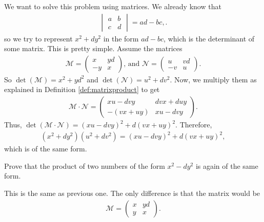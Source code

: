 \documentclass{subfile}
\begin{document}
\begin{solution}
We want to solve this problem using matrices. We already know that 
	\begin{align*}
	\begin{vmatrix}
	a&b\\
	c&d
	\end{vmatrix} = ad-bc,
	.\end{align*}
so we try to represent $x^2+dy^2$ in the form $ad-bc$, which is the determinant of some matrix. This is pretty simple. Assume the matrices
\begin{align*}
\mathcal{M}=\begin{pmatrix}
x & yd\\
-y & x
\end{pmatrix} \text{, and }
\mathcal{N}=\begin{pmatrix}
u & vd\\
-v & u
\end{pmatrix}.
\end{align*}
So $\det(\mathcal M)=x^2+yd^2$ and $\det(\mathcal{N})=u^2+dv^2$.
Now, we multiply them as explained in Definition \eqref{def:matrixproduct} to get
\begin{align*}
\mathcal{M}\cdot\mathcal{N}=\begin{pmatrix}
xu-dvy & dvx+duy\\
-(vx+uy) & xu-dvy
\end{pmatrix}.
\end{align*}
Thus, $\det(\mathcal{M \cdot N})=(xu-dvy)^2+d(vx+uy)^2$. Therefore, 
\begin{align*}
(x^2+dy^2)(u^2+dv^2)=(xu-dvy)^2+d(vx+uy)^2,
\end{align*}
which is of the same form.
\end{solution}

\begin{problem}
Prove that the product of two numbers of the form $x^2-dy^2$ is again of the same form.
\end{problem}

\begin{solution}
This is the same as previous one. The only difference is that the matrix would be
\begin{align*}
\mathcal{M}=\begin{pmatrix}
x & yd\\
y & x
\end{pmatrix}.
\end{align*}
\end{solution}
\end{document}
